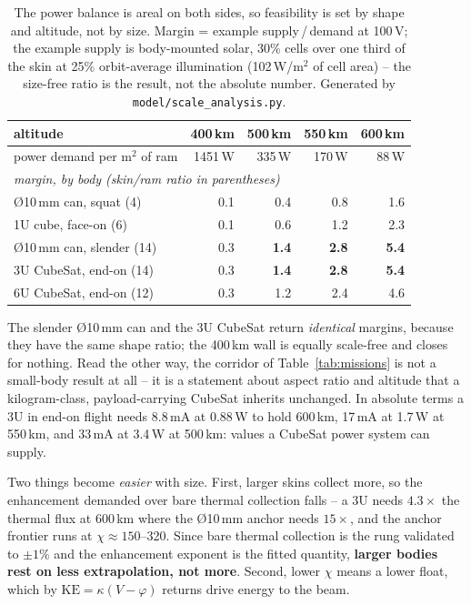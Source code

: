 \documentclass[11pt]{article}
\begin{document}
\begin{table}[t]\centering\small
\caption{The power balance is areal on both sides, so feasibility is set by
shape and altitude, not by size. Margin = example supply\,/\,demand at
100\,V; the example supply is body-mounted solar, 30\% cells over one third
of the skin at 25\% orbit-average illumination (102\,W/m$^2$ of cell area) --
the size-free ratio is the result, not the absolute number. Generated by
\texttt{model/scale\_analysis.py}.}
\label{tab:scalefree}
\begin{tabular}{lrrrr}
\toprule
altitude & 400\,km & 500\,km & 550\,km & 600\,km \\
\midrule
power demand per m$^2$ of ram & 1451\,W & 335\,W & 170\,W & 88\,W \\
\midrule
\multicolumn{5}{l}{\emph{margin, by body (skin/ram ratio in parentheses)}}\\
\O10\,mm can, squat \hfill (4) & 0.1 & 0.4 & 0.8 & 1.6 \\
1U cube, face-on \hfill (6) & 0.1 & 0.6 & 1.2 & 2.3 \\
\O10\,mm can, slender \hfill (14) & 0.3 & \textbf{1.4} & \textbf{2.8} & \textbf{5.4} \\
3U CubeSat, end-on \hfill (14) & 0.3 & \textbf{1.4} & \textbf{2.8} & \textbf{5.4} \\
6U CubeSat, end-on \hfill (12) & 0.3 & 1.2 & 2.4 & 4.6 \\
\bottomrule
\end{tabular}
\end{table}

The slender \O10\,mm can and the 3U CubeSat return \emph{identical} margins,
because they have the same shape ratio; the 400\,km wall is equally
scale-free and closes for nothing. Read the other way, the corridor of
Table~\ref{tab:missions} is not a small-body result at all -- it is a
statement about aspect ratio and altitude that a kilogram-class,
payload-carrying CubeSat inherits unchanged. In absolute terms a 3U in end-on flight needs 8.8\,mA at 0.88\,W
to hold 600\,km, 17\,mA at 1.7\,W at 550\,km, and 33\,mA at 3.4\,W at
500\,km: values a CubeSat power system can supply.

Two things become \emph{easier} with size. First, larger skins collect more,
so the enhancement demanded over bare thermal collection falls -- a 3U needs
$4.3\times$ the thermal flux at 600\,km where the \O10\,mm anchor needs
$15\times$, and the anchor frontier runs at $\chi \approx 150$--320. Since
bare thermal collection is the rung validated to $\pm1\%$ and the enhancement
exponent is the fitted quantity, \textbf{larger bodies rest on less
extrapolation, not more}. Second, lower $\chi$ means a lower float, which by
$\mathrm{KE} = \kappa(V-\varphi)$ returns drive energy to the beam.
\end{document}
